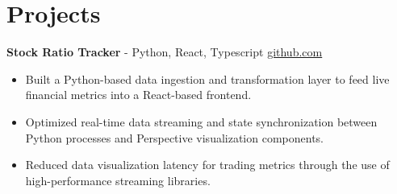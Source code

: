 \documentclass[11pt]{article}       %
\begin{document}

\vspace{-18.5pt}

\section*{Projects}

\textbf{Stock Ratio Tracker}{ - Python, React, Typescript} \hfill \href{https://github.com/Monica20030707/Trading-Dashboard_UI}{github.com} \\
\vspace{-9pt}
\begin{itemize}
  \item Built a Python-based data ingestion and transformation layer to feed live financial metrics into a React-based frontend.
  \item Optimized real-time data streaming and state synchronization between Python processes and Perspective visualization components.
  \item Reduced data visualization latency for trading metrics through the use of high-performance streaming libraries.
\end{itemize}

\end{document}
